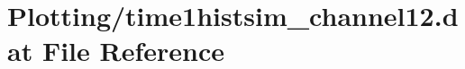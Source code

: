 \hypertarget{Plotting_2time1histsim__channel12_8dat}{}\section{Plotting/time1histsim\+\_\+channel12.dat File Reference}
\label{Plotting_2time1histsim__channel12_8dat}
